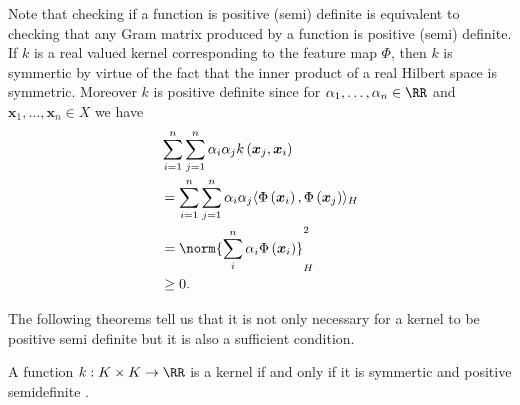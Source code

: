 Note that checking if a function is positive (semi) definite is equivalent to checking that any Gram matrix produced by a function is positive (semi) definite. If $k$ is a real valued kernel corresponding to the feature map $\Phi$, then $k$ is symmertic by virtue of the fact that the inner product of a real Hilbert space is symmetric. Moreover $k$ is positive definite since for $\alpha_1 , \ldots , \alpha_n \in \RR$ and $\bm{x}_1 ,\ldots , \bm{x}_n \in X$ we have
\begin{align*}
     & \sum_{i=1}^{n} \sum_{j=1}^{n} \alpha_i \alpha_j k \left( \bm{x}_j , \bm{x}_i \right)                                           \\
     & = \sum_{i=1}^{n} \sum_{j=1}^{n} \alpha_i \alpha_j \langle \Phi \left( \bm{x}_i \right), \Phi \left( \bm{x}_j \right) \rangle_H \\
     & = \norm{ \sum_i^n \alpha_i \Phi \left( \bm{x}_i \right) }_{H}^{2}                                                              \\
     & \geq 0.
\end{align*}

The following theorems tell us that it is not only necessary for a kernel to be positive semi definite but it is also a sufficient condition.

\begin{thm} \label{theorem: nec_and_suf_kernel_1}
    A function $k : K \times K \to \RR$ is a kernel if and only if it is symmertic and positive semidefinite \cite{SteinwartIngo2008SVMb}.
\end{thm}